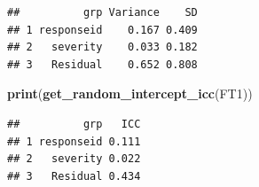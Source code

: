 \documentclass[
]{article}
\newenvironment{Shaded}{\begin{snugshade}}{\end{snugshade}}
\newcommand{\FunctionTok}[1]{\textcolor[rgb]{0.13,0.29,0.53}{\textbf{#1}}}
\newcommand{\NormalTok}[1]{#1}
\begin{document}
\begin{verbatim}
##          grp Variance    SD
## 1 responseid    0.167 0.409
## 2   severity    0.033 0.182
## 3   Residual    0.652 0.808
\end{verbatim}

\begin{Shaded}
\begin{Highlighting}[]
\FunctionTok{print}\NormalTok{(}\FunctionTok{get\_random\_intercept\_icc}\NormalTok{(FT1))}
\end{Highlighting}
\end{Shaded}

\begin{verbatim}
##          grp   ICC
## 1 responseid 0.111
## 2   severity 0.022
## 3   Residual 0.434
\end{verbatim}
\end{document}
